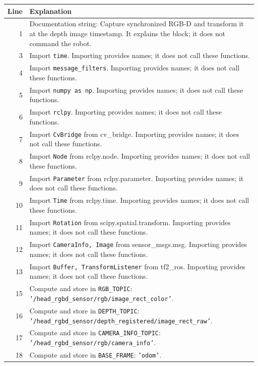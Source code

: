 \documentclass[11pt,a4paper]{book}
\begin{document}
\begin{longtable}{r p{}}

\textbf{Line} & \textbf{Explanation} \\ \hline \endhead

1 & Documentation string: Capture synchronized RGB-D and transform it at the depth image timestamp. It explains the block; it does not command the robot. \\

3 & Import \texttt{time}. Importing provides names; it does not call these functions. \\

4 & Import \texttt{message\_filters}. Importing provides names; it does not call these functions. \\

5 & Import \texttt{numpy as np}. Importing provides names; it does not call these functions. \\

6 & Import \texttt{rclpy}. Importing provides names; it does not call these functions. \\

7 & Import \texttt{CvBridge} from cv\_bridge. Importing provides names; it does not call these functions. \\

8 & Import \texttt{Node} from rclpy.node. Importing provides names; it does not call these functions. \\

9 & Import \texttt{Parameter} from rclpy.parameter. Importing provides names; it does not call these functions. \\

10 & Import \texttt{Time} from rclpy.time. Importing provides names; it does not call these functions. \\

11 & Import \texttt{Rotation} from scipy.spatial.transform. Importing provides names; it does not call these functions. \\

12 & Import \texttt{CameraInfo, Image} from sensor\_msgs.msg. Importing provides names; it does not call these functions. \\

13 & Import \texttt{Buffer, TransformListener} from tf2\_ros. Importing provides names; it does not call these functions. \\

15 & Compute and store in \texttt{RGB\_TOPIC}: \texttt{'/head\_rgbd\_sensor/rgb/image\_rect\_color'}.  \\

16 & Compute and store in \texttt{DEPTH\_TOPIC}: \texttt{'/head\_rgbd\_sensor/depth\_registered/image\_rect\_raw'}.  \\

17 & Compute and store in \texttt{CAMERA\_INFO\_TOPIC}: \texttt{'/head\_rgbd\_sensor/rgb/camera\_info'}.  \\

18 & Compute and store in \texttt{BASE\_FRAME}: \texttt{'odom'}.  \\

\end{longtable}
\end{document}

